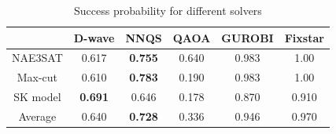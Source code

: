 \begin{table}[!ht]
    \centering
    \begin{tabular}{cccccc} \toprule
        ~ & D-wave & NNQS & QAOA & GUROBI & Fixstar \\ \midrule
        NAE3SAT & 0.617 & \textbf{0.755} & 0.640 & 0.983 & 1.00 \\
        Max-cut & 0.610 & \textbf{0.783} & 0.190 & 0.983 & 1.00 \\
        SK model & \textbf{0.691} & 0.646 & 0.178 & 0.870 & 0.910 \\ \midrule
        Average & 0.640 & \textbf{0.728} & 0.336 & 0.946 & 0.970 \\ \bottomrule
    \end{tabular}
\caption{Success probability for different solvers}
\label{results:allsuccess}
\end{table}

